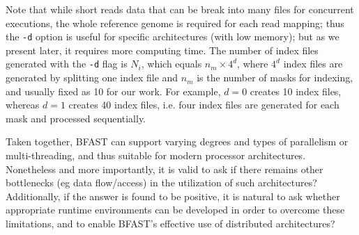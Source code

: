 \documentclass{cpeauth}
\begin{document}
Note that while short reads data that can be break into many files for concurrent executions,
the whole reference genome is required for each read mapping; thus the
\texttt{-d} option is useful for specific architectures (with low
memory); but as we present later, it requires more computing time.
The number of index files generated with the \texttt{-d} flag is
$N_i$, which equals $n_m \times 4^d$, where $4^d$ index files are
generated by splitting one index file and $n_m$ is the number of masks
for indexing, and usually fixed as 10 for our work.  For example,
$d=0$ creates 10 index files, whereas $d=1$ creates 40 index files,
i.e. four index files are generated for each mask and processed
sequentially.

Taken together, BFAST can support varying degrees and types of parallelism or multi-threading, and thus suitable for modern processor architectures.  Nonetheless and more importantly, it is valid to ask if there remains other bottlenecks
(eg data flow/access) in the utilization of such architectures?
Additionally, if the answer is found to be positive, it is natural to
ask whether appropriate runtime environments can be developed in order
to overcome these limitations, and to enable BFAST's effective use of
distributed architectures?







\end{document}
